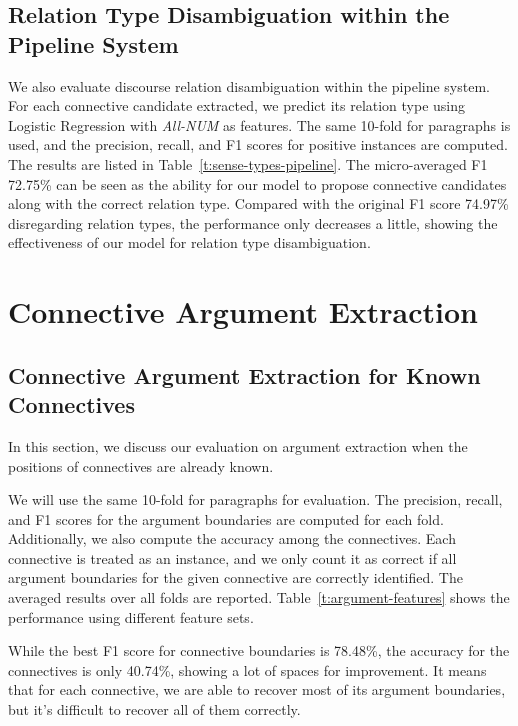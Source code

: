 

\subsection{Relation Type Disambiguation within the Pipeline System}

We also evaluate discourse relation disambiguation within the pipeline system.
For each connective candidate extracted, we predict its relation type using
Logistic Regression with \textit{All-NUM} as features.
The same 10-fold for paragraphs is used, and the precision, recall, and F1 scores
for positive instances are computed. The results are listed in
Table~\ref{t:sense-types-pipeline}. The micro-averaged F1 72.75\% can be seen
as the ability for our model to propose connective candidates along with the correct
relation type. Compared with the original F1 score 74.97\% disregarding relation types,
the performance only decreases a little, showing the effectiveness of our
model for relation type disambiguation.



\section{Connective Argument Extraction}

\subsection{Connective Argument Extraction for Known Connectives}

In this section, we discuss our evaluation on argument extraction when the
positions of connectives are already known.

We will use the same 10-fold for paragraphs for evaluation.
The precision, recall, and F1 scores for the argument boundaries are
computed for each fold. Additionally, we also compute the accuracy among the 
connectives. Each connective is treated as an instance, and we only count it
as correct if all argument boundaries for the given connective are correctly identified.
The averaged results over all folds are reported. Table~\ref{t:argument-features} shows
the performance using different feature sets.

While the best F1 score for connective boundaries is 78.48\%, the accuracy for
the connectives is only 40.74\%, showing a lot of spaces for
improvement. It means that for each connective, we are able to recover most of its
argument boundaries, but it's difficult to recover all of them correctly.

